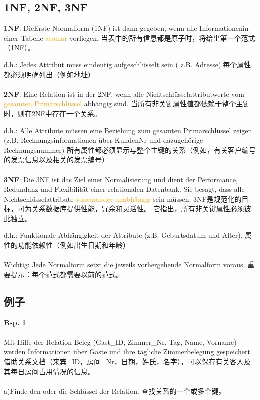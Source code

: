 \documentclass[fleqn]{article}
\begin{document}
\subsection{1NF, 2NF, 3NF}

\noindent \textbf{1NF}: DieErste Normalform (1NF) ist dann gegeben, wenn alle Informationenin einer Tabelle \textcolor{orange}{atomar} vorliegen.
当表中的所有信息都是原子时，将给出第一个范式（1NF）。

d.h.: Jedes Attribut muss eindeutig aufgeschlüsselt sein ( z.B. Adresse).每个属性都必须明确列出（例如地址）
\\
\\
\textbf{2NF}: Eine Relation ist in der 2NF, wenn alle Nichtschlüsselattributwerte vom \textcolor{orange}{gesamten Primärschlüssel} abhängig sind. 当所有非关键属性值都依赖于整个主键时，则在2NF中存在一个关系。

d.h.: Alle Attribute müssen eine Beziehung zum gesamten Primärschlüssel zeigen (z.B. Rechnungsinformationen über KundenNr und dazugehörige Rechnungsnummer)
所有属性都必须显示与整个主键的关系（例如，有关客户编号的发票信息以及相关的发票编号）
\\
\\
\textbf{3NF}: Die 3NF ist das Ziel einer Normalisierung und dient der Performance, Redundanz und Flexibilität einer relationalen Datenbank. Sie besagt, dass alle Nichtschlüsselattribute \textcolor{orange}{voneinander unabhängig} sein müssen.
3NF是规范化的目标，可为关系数据库提供性能，冗余和灵活性。 它指出，所有非关键属性必须彼此独立。

d.h.: Funktionale Abhängigkeit der Attribute (z.B. Geburtsdatum und Alter). 属性的功能依赖性（例如出生日期和年龄）
\\
\\
Wichtig: Jede Normalform setzt die jeweils vorhergehende Normalform voraus.
重要提示：每个范式都需要以前的范式。

\subsection{例子}

\noindent\textbf{Bsp. 1}
\\
\\
Mit Hilfe der Relation Beleg (Gast\_ID, Zimmer\_Nr, Tag, Name, Vorname) werden Informationen über Gäste und ihre tägliche Zimmerbelegung gespeichert.
借助关系文档（来宾\_ID，房间\_Nr，日期，姓氏，名字），可以保存有关客人及其每日房间占用情况的信息。
\\
\\
a)Finde den oder die Schlüssel der Relation. 查找关系的一个或多个键。
\end{document}
